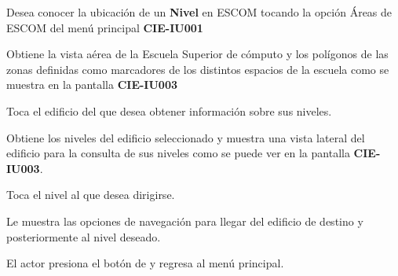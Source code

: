  \begin{UCtrayectoria}
    \UCpaso[\UCactor] Desea conocer la ubicación de un \textbf{Nivel} en ESCOM tocando la opción Áreas de ESCOM del menú principal \textbf{CIE-IU001}

\UCpaso[\UCsist] Obtiene la vista aérea de la Escuela Superior de cómputo y los polígonos de las zonas definidas como marcadores de los distintos espacios de la escuela como se muestra en la pantalla \textbf{CIE-IU003}

\UCpaso[\UCactor] Toca el edificio del que desea obtener información sobre sus niveles. 

\UCpaso[\UCsist] Obtiene los niveles del edificio seleccionado y muestra una vista lateral del edificio para la consulta de sus niveles como se puede ver en la pantalla \textbf{CIE-IU003}.

\UCpaso[\UCactor] Toca el nivel al que desea dirigirse.

\UCpaso[\UCsist] Le muestra las opciones de navegación para llegar del edificio de destino y posteriormente al nivel deseado.

\UCpaso[\UCactor] El actor presiona el botón de  y regresa al menú principal.
 \end{UCtrayectoria}

%    
%   
% 

 
%
%
 
